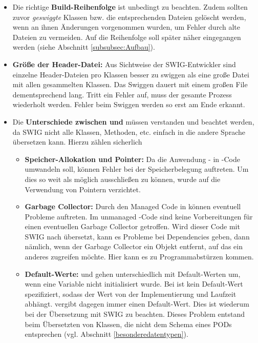 \begin{itemize}
\item Die richtige \textbf{Build-Reihenfolge} ist unbedingt zu beachten. Zudem sollten zuvor \emph{geswiggte} Klassen bzw. die entsprechenden Dateien gelöscht werden, wenn an ihnen Änderungen vorgenommen wurden, um Fehler durch alte Dateien zu vermeiden. Auf die Reihenfolge soll später näher eingegangen werden (siehe Abschnitt \ref{subsubsec:Aufbau}).
\item \textbf{Größe der Header-Datei:} Aus Sichtweise der SWIG-Entwickler sind einzelne Header-Dateien pro Klassen besser zu swiggen als eine große Datei mit allen gesammelten Klassen. Das Swiggen dauert mit einem großen File dementsprechend lang. Tritt ein Fehler auf, muss der gesamte Prozess wiederholt werden. Fehler beim Swiggen werden so erst am Ende erkannt. %
\item Die \textbf{Unterschiede zwischen \CC und \CS}müssen verstanden und beachtet werden, da SWIG nicht alle Klassen, Methoden, etc. einfach in die andere Sprache übersetzen kann. Hierzu zählen sicherlich 
	\begin{itemize}
	\item \textbf{Speicher-Allokation und Pointer:}
	Da die Anwendung \CC - in \CS -Code umwandeln soll, können Fehler bei der Speicherbelegung auftreten. Um dies so weit als möglich ausschließen zu können, wurde auf die Verwendung von Pointern verzichtet.
	\item \textbf{Garbage Collector:} Durch den Managed Code in \CS können eventuell Probleme auftreten. Im unmanaged \CC -Code sind keine Vorbereitungen für einen eventuellen Garbage Collector getroffen. Wird dieser Code mit SWIG nach \CS übersetzt, kann es Probleme bei Dependencies geben, dann nämlich, wenn der Garbage Collector ein Objekt entfernt, auf das ein anderes zugreifen möchte. Hier kann es zu Programmabstürzen kommen.
	\item \textbf{Default-Werte:} \CC und \CS gehen unterschiedlich mit Default-Werten um, wenn eine Variable nicht initialisiert wurde. Bei \CC ist kein Default-Wert spezifiziert, sodass der Wert von der Implementierung und Laufzeit abhängt. \CS vergibt dagegen immer einen Default-Wert. Dies ist wiederum bei der Übersetzung mit SWIG zu beachten. Dieses Problem entstand beim Übersetzten von Klassen, die nicht dem Schema eines PODs entsprechen (vgl. Abschnitt \ref{besonderedatentypen}).

\end{itemize}
\end{itemize}

